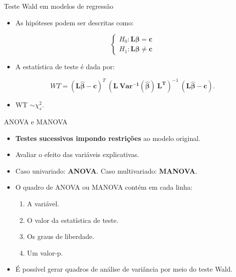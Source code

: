 \documentclass[
  ignorenonframetext,
  serif,
  professionalfont,
  usenames,
  dvipsnames,
  aspectratio = 169]{beamer}
\begin{document}
\begin{frame}{Teste Wald em modelos de regressão}
\protect\hypertarget{teste-wald-em-modelos-de-regressuxe3o-2}{}
\begin{itemize}

  \itemsep 2ex
  
  \item As hipóteses podem ser descritas como:

$$
\left\{\begin{matrix}
H_0: \boldsymbol{L}\boldsymbol{\beta} = \boldsymbol{c} \\ 
H_1: \boldsymbol{L}\boldsymbol{\beta} \neq \boldsymbol{c}
\end{matrix}\right.
$$

  \item A estatística de teste é dada por:

$$
WT = (\boldsymbol{L\hat\beta} - \boldsymbol{c})^T \ (\boldsymbol{L \ Var^{-1}(\hat\beta) \ L^T})^{-1} \ (\boldsymbol{L\hat\beta} - \boldsymbol{c}).
$$

 \item  WT $\sim \chi^2_s$.

\end{itemize}
\end{frame}

\begin{frame}{ANOVA e MANOVA}
\protect\hypertarget{anova-e-manova}{}
\begin{itemize}

  \itemsep 2ex

  \item \textbf{Testes sucessivos impondo restrições} ao modelo original. 

  \item Avaliar o efeito das variáveis explicativas. 
  
  \item Caso univariado: \textbf{ANOVA}. Caso multivariado: \textbf{MANOVA}.

  \item O quadro de ANOVA ou MANOVA contém em cada linha: 
    \begin{enumerate}
      \item A variável. 
      \item O valor da estatística de teste. 
      \item Os graus de liberdade. 
      \item Um valor-p.
    \end{enumerate}

  \item É possível gerar quadros de análise de variância por meio do teste Wald.

  \end{itemize}
\end{frame}
\end{document}
